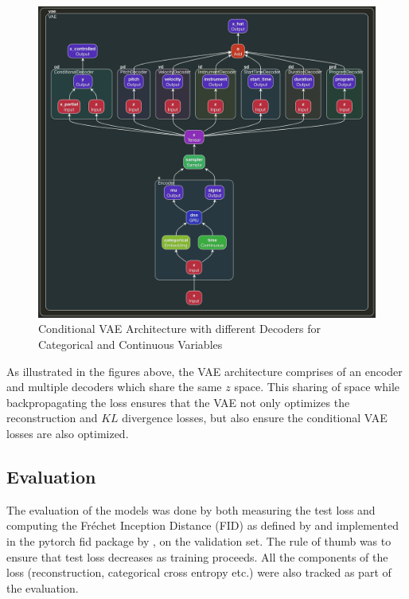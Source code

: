 \documentclass{article}
\begin{document}
\begin{center}
\begin{figure}
\includegraphics[width=1.0\linewidth]{midi_vae.png}
\caption{Conditional VAE Architecture with different Decoders for Categorical and Continuous Variables}
\end{figure}
\end{center}

As illustrated in the figures above, the VAE architecture comprises of an encoder and multiple decoders which share the same $z$ space. This sharing of space while backpropagating the loss ensures that the VAE not only optimizes the reconstruction and $KL$ divergence losses, but also ensure the conditional VAE losses are also optimized.

\subsection{Evaluation}

The evaluation of the models was done by both measuring the test loss and computing the Fréchet Inception Distance (FID) as defined by \cite{heusel2018gans} and implemented in the pytorch fid package by \cite{Seitzer2020FID}, on the validation set. The rule of thumb was to ensure that test loss decreases as training proceeds. All the components of the loss (reconstruction, categorical cross entropy etc.) were also tracked as part of the evaluation.
\end{document}
